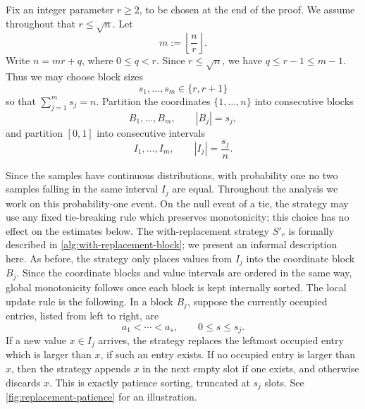\documentclass[11pt,reqno,letterpaper]{amsart}
\theoremstyle{definition}
\numberwithin{equation}{section}
\newcommand{\floor}[1]{\left\lfloor #1 \right\rfloor}
\begin{document}
Fix an integer parameter \(r\ge2\), to be chosen at the end of the proof.  We assume throughout that \(r\le \sqrt n\).  Let
\[
m:=\floor{\frac nr}.
\]
Write \(n=mr+q\), where \(0\le q<r\).  Since \(r\le \sqrt n\), we have \(q\le r-1\le m-1\).  Thus we may choose block sizes
\[
s_1,\dots,s_m\in\{r,r+1\}
\]
so that \(\sum_{j=1}^m s_j=n\).  Partition the coordinates \(\{1,\dots,n\}\) into consecutive blocks
\[
B_1,\dots,B_m,
\qquad
|B_j|=s_j,
\]
and partition \([0,1]\) into consecutive intervals
\[
I_1,\dots,I_m,
\qquad
|I_j|=\frac{s_j}{n}.
\]

Since the samples have continuous distributions, with probability one no two samples
falling in the same interval \(I_j\) are equal. Throughout the analysis we work on
this probability-one event. On the null event of a tie, the strategy may use any fixed
tie-breaking rule which preserves monotonicity; this choice has no effect on the
estimates below. The with-replacement strategy $S'_r$ is formally described in \cref{alg:with-replacement-block}; we present an informal description here. As before, the strategy only places values from \(I_j\) into the coordinate block \(B_j\).  Since the coordinate blocks and value intervals are ordered in the same way, global monotonicity follows once each block is kept internally sorted. The local update rule is the following. In a block \(B_j\), suppose the currently occupied entries, listed from left to right, are
\[
a_1<\cdots<a_s,
\qquad 0\le s\le s_j.
\]
If a new value \(x\in I_j\) arrives, the strategy replaces the leftmost occupied entry which is larger than \(x\), if such an entry exists.  If no occupied entry is larger than \(x\), then the strategy appends \(x\) in the next empty slot if one exists, and otherwise discards \(x\). This is exactly patience sorting, truncated at $s_j$ slots. See \cref{fig:replacement-patience} for an illustration. 
\end{document}
